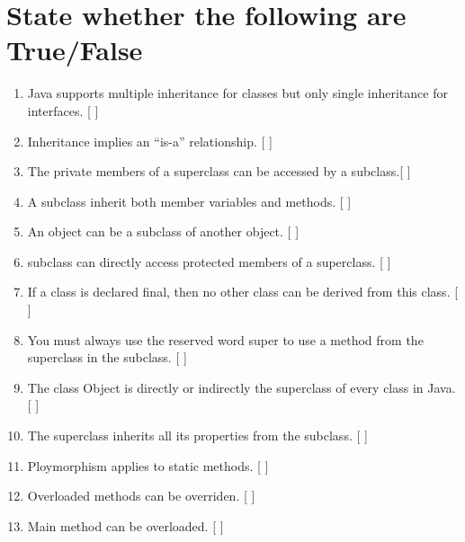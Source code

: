 \documentclass[11pt,a4paper]{article}
\begin{document}
\section*{State whether the following are True/False}
\begin{enumerate}\itemsep2pt
\item Java supports multiple inheritance for classes but only single inheritance for interfaces. [ ]
\item Inheritance implies an “is-a” relationship. [   ]
\item The private members of a superclass can be accessed by a subclass.[ ]
\item A subclass inherit both member variables and methods. [ ]
\item An object can be a subclass of another object. [ ]
\item subclass can directly access protected members of a superclass. [ ]
\item If a class is declared final, then no other class can be derived from this class. [ ]  %
\item You must always use the reserved word super to use a method from the superclass in the subclass. [ ]  %
\item The class Object is directly or indirectly the superclass of every class in Java. [ ] %
\item The superclass inherits all its properties from the subclass. [ ] %

\item Ploymorphism applies to static methods. [ ]
\item Overloaded methods can be overriden. [ ]
\item Main method can be overloaded. [ ]
\end{enumerate}
\end{document}
